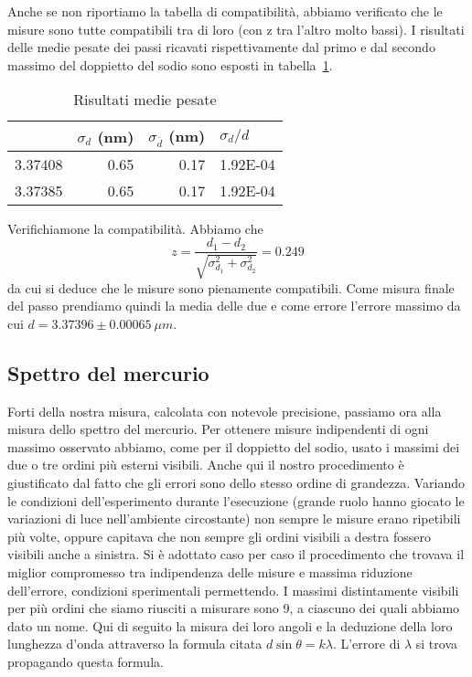 \documentclass[a4paper,10pt]{article}
\begin{document}
	Anche se non riportiamo la tabella di compatibilità, abbiamo verificato che le misure sono tutte compatibili tra di loro (con z tra l'altro molto bassi). I risultati delle medie pesate dei passi ricavati rispettivamente dal primo e dal secondo massimo del doppietto del sodio sono esposti in tabella~\ref{tab3}.
	
	\begin{table}[htbp]
  \centering
  \caption{Risultati medie pesate}
  	\medskip
    \begin{tabular}{rrrr}
    \bottomrule
    \rowcolor[rgb]{ .267,  .447,  .769} \multicolumn{1}{l}{\textcolor[rgb]{ 1,  1,  1}{\textbf{$d$ ($ \mu $m)}}} & \multicolumn{1}{l}{\textcolor[rgb]{ 1,  1,  1}{\textbf{$\sigma _d$ (nm)}}} & \multicolumn{1}{l}{\textcolor[rgb]{ 1,  1,  1}{\textbf{$\sigma _{\overline{d}}$ (nm)}}} & \multicolumn{1}{l}{\textcolor[rgb]{ 1,  1,  1}{\textbf{$\sigma _d / d$}}} \\
    \toprule
    3.37408 & 0.65 & 0.17 & 1.92E-04 \\
    3.37385 & 0.65 & 0.17 & 1.92E-04 \\
    \toprule
    \end{tabular}%
  \label{tab3}%
\end{table}%

	Verifichiamone la compatibilità. Abbiamo che $$z = \frac{d_1 - d_2}{\sqrt{\sigma _{d_1} ^2 +\sigma _{d_2} ^2}} = 0.249$$ da cui si deduce che le misure sono pienamente compatibili. Come misura finale del passo prendiamo quindi la media delle due e come errore l'errore massimo da cui $d = 3.37396 \pm 0.00065 \ \mu m$.
	
	\subsection{Spettro del mercurio}
	Forti della nostra misura, calcolata con notevole precisione, passiamo ora alla misura dello spettro del mercurio. Per ottenere misure indipendenti di ogni massimo osservato abbiamo, come per il doppietto del sodio, usato i massimi dei due o tre ordini più esterni visibili. Anche qui il nostro procedimento è giustificato dal fatto che gli errori sono dello stesso ordine di grandezza. Variando le condizioni dell'esperimento durante l'esecuzione (grande ruolo hanno giocato le variazioni di luce nell'ambiente circostante) non sempre le misure erano ripetibili più volte, oppure capitava che non sempre gli ordini visibili a destra fossero visibili anche a sinistra. Si è adottato caso per caso il procedimento che trovava il miglior compromesso tra indipendenza delle misure e massima riduzione dell'errore, condizioni sperimentali permettendo. I massimi distintamente visibili per più ordini che siamo riusciti a misurare sono 9, a ciascuno dei quali abbiamo dato un nome. Qui di seguito la misura dei loro angoli e la deduzione della loro lunghezza d'onda attraverso la formula citata $d \sin \theta = k \lambda$. L'errore di $\lambda$ si trova propagando questa formula.
        
\end{document}
